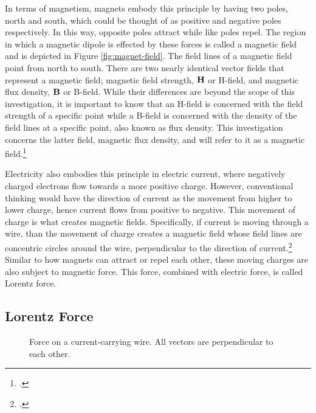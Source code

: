 In terms of magnetism, magnets embody this principle by having two poles, north and south, which could be thought of as positive and negative poles respectively.
In this way, opposite poles attract while like poles repel.
The region in which a magnetic dipole is effected by these forces is called a magnetic field and is depicted in Figure \ref{fig:magnet-field}.
The field lines of a magnetic field point from north to south.
There are two nearly identical vector fields that represent a magnetic field; magnetic field strength, $\bm{\mathbf{H}}$ or H-field, and magnetic flux density, $\bm{\mathbf{B}}$ or B-field.
While their differences are beyond the scope of this investigation, it is important to know that an H-field is concerned with the field strength of a specific point while a B-field is concerned with the density of the field lines at a specific point, also known as flux density.
This investigation concerns the latter field, magnetic flux density, and will refer to it as a magnetic field.\footcite{britfields}

Electricity also embodies this principle in electric current, where negatively charged electrons flow towards a more positive charge.
However, conventional thinking would have the direction of current as the movement from higher to lower charge, hence current flows from positive to negative.
This movement of charge is what creates magnetic fields.
Specifically, if current is moving through a wire, than the movement of charge creates a magnetic field whose field lines are concentric circles around the wire, perpendicular to the direction of current.\footcite{msufields}
Similar to how magnets can attract or repel each other, these moving charges are also subject to magnetic force.
This force, combined with electric force, is called Lorentz force.

\subsection*{Lorentz Force}

\begin{figure}
	\centering
	\caption{Force on a current-carrying wire. All vectors are perpendicular to each other.}
	\label{fig:laplace-force}
\end{figure}


